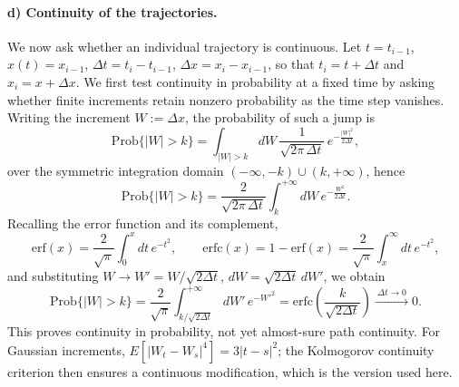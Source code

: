 \paragraph{d) Continuity of the trajectories.}
We now ask whether an individual trajectory is continuous.
Let $t=t_{i-1}$, $x(t)=x_{i-1}$, $\Delta t=t_i-t_{i-1}$, $\Delta x=x_i-x_{i-1}$, so that $t_i=t+\Delta t$ and $x_i=x+\Delta x$.
We first test continuity in probability at a fixed time by asking whether finite increments retain nonzero probability as the time step vanishes.
Writing the increment $W:=\Delta x$, the probability of such a jump is
\begin{equation}
\mathrm{Prob}\{|W|>k\} = \int_{|W|>k} dW\, \frac{1}{\sqrt{2\pi\,\Delta t}}\,e^{-\frac{|W|^2}{2\Delta t}},
\end{equation}
over the symmetric integration domain $(-\infty,-k)\cup(k,+\infty)$, hence
\begin{equation}
\mathrm{Prob}\{|W|>k\} = \frac{2}{\sqrt{2\pi\,\Delta t}}\int_k^{+\infty} dW\, e^{-\frac{W^2}{2\Delta t}}.
\end{equation}
Recalling the error function and its complement,
\begin{equation}
\mathrm{erf}(x) = \frac{2}{\sqrt{\pi}}\int_0^x dt\, e^{-t^2},\qquad
\mathrm{erfc}(x) = 1-\mathrm{erf}(x) = \frac{2}{\sqrt{\pi}}\int_x^{\infty} dt\, e^{-t^2},
\end{equation}
and substituting $W\to W' = W/\sqrt{2\Delta t}$, $dW=\sqrt{2\Delta t}\,dW'$, we obtain
\begin{equation}
\mathrm{Prob}\{|W|>k\} = \frac{2}{\sqrt\pi}\int_{k/\sqrt{2\Delta t}}^{+\infty} dW'\, e^{-W'^2}
= \mathrm{erfc}\!\left(\frac{k}{\sqrt{2\Delta t}}\right) \xrightarrow{\ \Delta t\to0\ } 0.
\end{equation}
This proves continuity in probability, not yet almost-sure path continuity.
For Gaussian increments, $E[|W_t-W_s|^4]=3|t-s|^2$; the Kolmogorov continuity criterion then ensures a continuous modification, which is the version used here.

